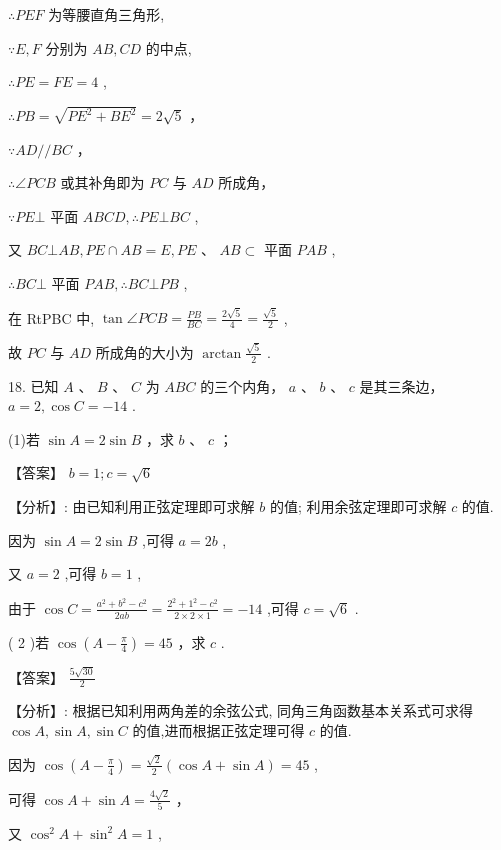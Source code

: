 \documentclass[10pt]{article}
\begin{document}
\(\therefore {PEF}\) 为等腰直角三角形,

\(\because E,F\) 分别为 \({AB},{CD}\) 的中点,

\(\therefore {PE} = {FE} = 4\) ,

\(\therefore {PB} = \sqrt{P{E}^{2} + B{E}^{2}} = {2\sqrt{5}}\) ，

\(\because {AD}//{BC}\) ，

\(\therefore \angle {PCB}\) 或其补角即为 \({PC}\) 与 \({AD}\) 所成角，

\(\because {PE} \bot\) 平面 \({ABCD},\therefore {PE} \bot  {BC}\) ,

又 \({BC} \bot  {AB},{PE} \cap  {AB} = E,{PE}\text{ 、 }{AB} \subset\) 平面 \({PAB}\) ,

\(\therefore {BC} \bot\) 平面 \({PAB},\therefore {BC} \bot  {PB}\) ,

在 RtPBC 中, \(\tan \angle {PCB} = \frac{PB}{BC} = \frac{2\sqrt{5}}{4} = \frac{\sqrt{5}}{2}\) ,

故 \({PC}\) 与 \({AD}\) 所成角的大小为 \(\arctan \frac{\sqrt{5}}{2}\) .

18. 已知 \(A\text{ 、 }B\text{ 、 }C\) 为 \({ABC}\) 的三个内角， \(a\text{ 、 }b\text{ 、 }c\) 是其三条边， \(a = 2,\cos C =  - {14}\) .

(1)若 \(\sin A = 2\sin B\) ，求 \(b\text{ 、 }c\) ；

【答案】 \(b = 1;c = \sqrt{6}\)

【分析】: 由已知利用正弦定理即可求解 \(b\) 的值; 利用余弦定理即可求解 \(c\) 的值.

因为 \(\sin A = 2\sin B\) ,可得 \(a = {2b}\) ,

又 \(a = 2\) ,可得 \(b = 1\) ,

由于 \(\cos C = \frac{{a}^{2} + {b}^{2} - {c}^{2}}{2ab} = \frac{{2}^{2} + {1}^{2} - {c}^{2}}{2 \times  2 \times  1} =  - {14}\) ,可得 \(c = \sqrt{6}\) .

( 2 )若 \(\cos \left( {A - \frac{\pi }{4}}\right)  = {45}\) ，求 \(c\) .

【答案】 \(\frac{5\sqrt{30}}{2}\)

【分析】: 根据已知利用两角差的余弦公式, 同角三角函数基本关系式可求得 \(\cos A,\sin A,\sin C\) 的值,进而根据正弦定理可得 \(c\) 的值.

因为 \(\cos \left( {A - \frac{\pi }{4}}\right)  = \frac{\sqrt{2}}{2}\left( {\cos A + \sin A}\right)  = {45}\) ,

可得 \(\cos A + \sin A = \frac{4\sqrt{2}}{5}\) ，

又 \({\cos }^{2}A + {\sin }^{2}A = 1\) ,
\end{document}
